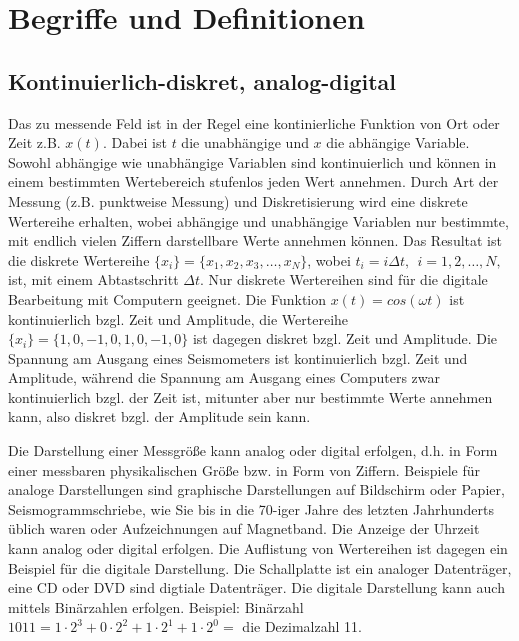 \chapter{Begriffe und Definitionen}
\section{Kontinuierlich-diskret, analog-digital}
Das zu messende Feld ist in der Regel eine kontinierliche Funktion von Ort oder Zeit z.B. $x(t)$. Dabei ist $t$ die unabhängige und $x$ die abhängige Variable. Sowohl abhängige wie unabhängige Variablen sind kontinuierlich und können in einem bestimmten Wertebereich stufenlos jeden Wert annehmen. Durch Art der Messung (z.B. punktweise Messung) und Diskretisierung wird eine diskrete Wertereihe erhalten, wobei abhängige und unabhängige Variablen nur bestimmte, mit endlich vielen Ziffern darstellbare Werte annehmen können. Das Resultat ist die diskrete Wertereihe  $\{x_{i}\}=\{x_{1}, x_{2}, x_{3}, \dots, x_N\}$, wobei   $t_{i}=i\Delta t,~~ i =1,2, \dots, N,$ ist, mit einem Abtastschritt $\Delta t$. Nur diskrete Wertereihen sind für die digitale Bearbeitung mit Computern geeignet.  Die Funktion $x(t)=cos(\omega t)$ ist kontinuierlich bzgl. Zeit und Amplitude, die Wertereihe $\{ x_i \}= \{1,0,-1,0,1,0,-1,0\}$ ist dagegen diskret bzgl. Zeit und Amplitude. Die Spannung am Ausgang eines Seismometers ist kontinuierlich bzgl. Zeit und Amplitude, während die Spannung am Ausgang eines Computers zwar kontinuierlich bzgl. der Zeit ist, mitunter aber nur bestimmte Werte annehmen kann, also diskret bzgl. der Amplitude sein kann.     

Die Darstellung einer Messgröße kann analog oder digital erfolgen, d.h. in Form einer messbaren physikalischen Größe bzw. in Form von Ziffern. Beispiele für analoge Darstellungen sind graphische Darstellungen auf Bildschirm oder Papier, Seismogrammschriebe, wie Sie bis in die 70-iger Jahre des letzten Jahrhunderts üblich waren oder Aufzeichnungen auf Magnetband.  Die Anzeige der Uhrzeit kann analog oder digital erfolgen.  Die Auflistung von Wertereihen ist dagegen ein Beispiel für die digitale Darstellung. Die Schallplatte ist ein analoger Datenträger, eine CD oder DVD sind digtiale Datenträger. Die digitale Darstellung kann auch mittels Binärzahlen erfolgen. Beispiel: Binärzahl $1011=1\cdot 2^{3} + 0 \cdot 2^2 + 1 \cdot 2^1 + 1 \cdot 2^0 =$ die Dezimalzahl 11.

